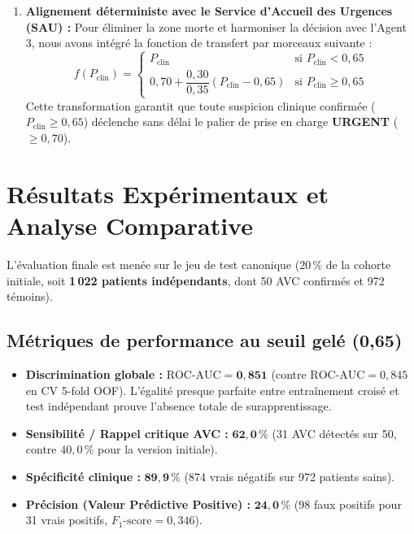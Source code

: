 \documentclass[11pt,a4paper]{article}
\begin{document}
\begin{enumerate}[label=\textbf{\arabic*.}]
    \item \textbf{Alignement déterministe avec le Service d'Accueil des Urgences (SAU) :}
    Pour éliminer la zone morte et harmoniser la décision avec l'Agent 3, nous avons intégré la fonction de transfert par morceaux suivante :
    \begin{equation}
        f(P_{\text{clin}}) = 
        \begin{cases} 
            P_{\text{clin}} & \text{si } P_{\text{clin}} < 0{,}65 \\[6pt]
            0{,}70 + \dfrac{0{,}30}{0{,}35} \left(P_{\text{clin}} - 0{,}65\right) & \text{si } P_{\text{clin}} \ge 0{,}65
        \end{cases}
    \end{equation}
    Cette transformation garantit que toute suspicion clinique confirmée ($P_{\text{clin}} \ge 0{,}65$) déclenche sans délai le palier de prise en charge \textbf{URGENT} ($\ge 0{,}70$).
\end{enumerate}

\section{Résultats Expérimentaux et Analyse Comparative}

L'évaluation finale est menée sur le jeu de test canonique ($20\,\%$ de la cohorte initiale, soit \textbf{1\,022 patients indépendants}, dont 50 AVC confirmés et 972 témoins).

\subsection{Métriques de performance au seuil gelé (0,65)}
\begin{itemize}[leftmargin=*]
    \item \textbf{Discrimination globale :} $\text{ROC-AUC} = \mathbf{0{,}851}$ (contre $\text{ROC-AUC} = 0{,}845$ en CV 5-fold OOF). L'égalité presque parfaite entre entraînement croisé et test indépendant prouve l'absence totale de surapprentissage.
    \item \textbf{Sensibilité / Rappel critique AVC :} $\mathbf{62{,}0\,\%}$ (31 AVC détectés sur 50, contre $40{,}0\,\%$ pour la version initiale).
    \item \textbf{Spécificité clinique :} $\mathbf{89{,}9\,\%}$ (874 vrais négatifs sur 972 patients sains).
    \item \textbf{Précision (Valeur Prédictive Positive) :} $\mathbf{24{,}0\,\%}$ (98 faux positifs pour 31 vrais positifs, $F_1\text{-score} = 0{,}346$).
\end{itemize}
\end{document}
